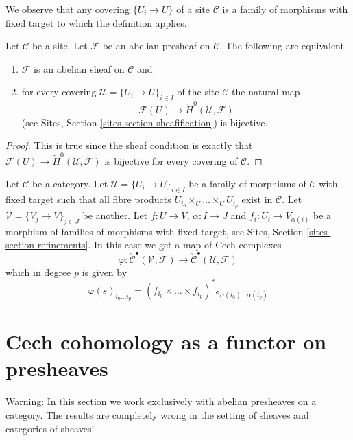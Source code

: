 \noindent
We observe that any covering $\{U_i \to U\}$ of a site $\mathcal{C}$
is a family of morphisms with fixed target to which the definition applies.

\begin{lemma}
\label{lemma-cech-h0}
Let $\mathcal{C}$ be a site.
Let $\mathcal{F}$ be an abelian presheaf on $\mathcal{C}$.
The following are equivalent
\begin{enumerate}
\item $\mathcal{F}$ is an abelian sheaf on $\mathcal{C}$ and
\item for every covering $\mathcal{U} = \{U_i \to U\}_{i \in I}$
of the site $\mathcal{C}$ the natural map
$$
\mathcal{F}(U) \to \check{H}^0(\mathcal{U}, \mathcal{F})
$$
(see Sites, Section \ref{sites-section-sheafification}) is bijective.
\end{enumerate}
\end{lemma}

\begin{proof}
This is true since the sheaf condition is exactly that
$\mathcal{F}(U) \to \check{H}^0(\mathcal{U}, \mathcal{F})$
is bijective for every covering of $\mathcal{C}$.
\end{proof}

\noindent
Let $\mathcal{C}$ be a category. Let $\mathcal{U} = \{U_i \to U\}_{i\in I}$
be a family of morphisms of $\mathcal{C}$ with fixed target such that
all fibre products $U_{i_0} \times_U \ldots \times_U U_{i_p}$ exist in
$\mathcal{C}$. Let $\mathcal{V} = \{V_j \to V\}_{j\in J}$ be another.
Let $f : U \to V$, $\alpha : I \to J$ and $f_i : U_i \to V_{\alpha(i)}$
be a morphism of families of morphisms with fixed target, see
Sites, Section \ref{sites-section-refinements}.
In this case we get a map of Cech complexes
\begin{equation}
\label{equation-map-cech-complexes}
\varphi : \check{\mathcal{C}}^\bullet(\mathcal{V}, \mathcal{F})
\longrightarrow
\check{\mathcal{C}}^\bullet(\mathcal{U}, \mathcal{F})
\end{equation}
which in degree $p$ is given by
$$
\varphi(s)_{i_0 \ldots i_p} =
(f_{i_0} \times \ldots \times f_{i_p})^*s_{\alpha(i_0) \ldots \alpha(i_p)}
$$


\section{Cech cohomology as a functor on presheaves}
\label{section-cech-functor}

\noindent
Warning: In this section we work exclusively with abelian presheaves
on a category. The results are completely wrong in the
setting of sheaves and categories of sheaves!

